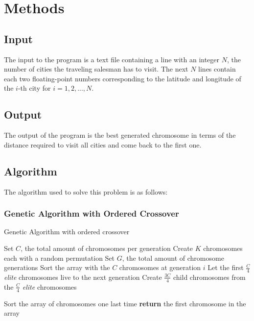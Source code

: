 \documentclass[twoside,twocolumn]{article}
\begin{document}
  
  \section{Methods}
  
  \subsection{Input}
  The input to the program is a text file containing a line with an integer $N$, the number of cities the traveling salesman has to visit. The next $N$ lines contain each two floating-point numbers corresponding to the latitude and longitude of the $i$-th city for $i = 1,2,...,N$.
  
  \subsection{Output}
  The output of the program is the best generated chromosome in terms of the distance required to visit all cities and come back to the first one.
  
  \subsection{Algorithm} 
  The algorithm used to solve this problem is as follows:
  
  \subsubsection{Genetic Algorithm with Ordered Crossover}
  
  \begin{algorithm}
          \caption{Genetic Algorithm with ordered crossover}\label{ga}
          {\fontsize{6}{6}\selectfont \begin{algorithmic}[1]
              \State Set $C$, the total amount of chromosomes per generation
              \State Create $K$ chromosomes each with a random permutation
              \State Set $G$, the total amount of chromosome generations 
                \State Sort the array with the $C$ chromosomes at generation $i$
                  \State Let the first $\frac{C}{4}$ \textit{elite} chromosomes live to the next generation
                  \State Create $\frac{3C}{4}$ child chromosomes from the $\frac{C}{4}$ \textit{elite} chromosomes
            
              \EndFor
              \State Sort the array of chromosomes one last time
              \State \textbf{return} the first chromosome in the array
              \EndProcedure
          \end{algorithmic}}
      \end{algorithm}
  
\end{document}
